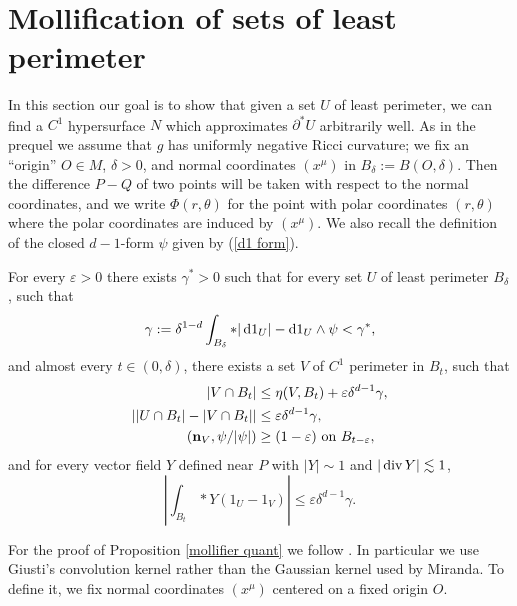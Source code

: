 \section{Mollification of sets of least perimeter}\label{MollifierSection}
In this section our goal is to show that given a set $U$ of least perimeter, we can find a $C^1$ hypersurface $N$ which approximates $\partial^* U$ arbitrarily well.
As in the prequel we assume that $g$ has uniformly negative Ricci curvature; we fix an ``origin'' $O \in M$, $\delta > 0$, and normal coordinates $(x^\mu)$ in $B_\delta := B(O, \delta)$.
Then the difference $P - Q$ of two points will be taken with respect to the normal coordinates, and we write $\Phi(r, \theta)$ for the point with polar coordinates $(r, \theta)$ where the polar coordinates are induced by $(x^\mu)$.
We also recall the definition of the closed $d-1$-form $\psi$ given by (\ref{d1 form}).

\begin{proposition}\label{mollifier quant}
For every $\varepsilon > 0$ there exists $\gamma^* > 0$ such that for every set $U$ of least perimeter $B_\delta$, such that
\begin{equation}\label{bootstrap the mollifier}
\gamma := \delta^{1 - d}\int_{B_\delta} *|\mathop{}\!\mathrm{d} 1_U| - \mathop{}\!\mathrm{d} 1_U \wedge \psi < \gamma^*,
\end{equation}
and almost every $t \in (0, \delta)$, there exists a set $V$ of $C^1$ perimeter in $B_t$, such that
\begin{align}
|V \cap B_t| &\leq \eta(V, B_t) + \varepsilon \delta^{d - 1} \gamma, \label{mollifier quant1}\\
\left||U \cap B_t| - |V \cap B_t|\right| &\leq \varepsilon \delta^{d - 1} \gamma, \label{mollifier quant2}\\
(\mathbf n_V, \psi/|\psi|) &\geq (1 - \varepsilon) \text{ on } B_{t-\varepsilon}, \label{mollifier quant4}
\end{align}
and for every vector field $Y$ defined near $P$ with $|Y| \sim 1$ and $|\operatorname{div} Y| \lesssim 1$,
\begin{equation}
\left|\int_{B_t} *Y(1_U - 1_V)\right| \leq \varepsilon \delta^{d - 1} \gamma. \label{mollifier quant3}
\end{equation}
\end{proposition}

For the proof of Proposition \ref{mollifier quant} we follow \cite[Chapter 7]{Giusti77}.
In particular we use Giusti's convolution kernel rather than the Gaussian kernel used by Miranda.
To define it, we fix normal coordinates $(x^\mu)$ centered on a fixed origin $O$.

